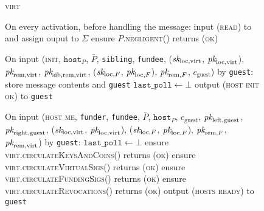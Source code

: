 \begin{figure}[H]
  \begin{processbox}{\textsc{virt}}
    \begin{algorithmic}[1]
      \State On every activation, before handling the message:
      \Indent
         
          \State input (\textsc{read}) to \ledger and assign ouput to $\Sigma$
              \State ensure $P$.\textsc{negligent}() returns (\textsc{ok})
            \EndFor
          \EndIf
        \EndIf
      \EndIndent
      \Statex

      \State {}
      \State On input (\textsc{init}, $\texttt{host}_P$, $\bar{P}$,
      \texttt{sibling}, \texttt{fundee}, ($\textit{sk}_{\mathrm{loc}, \mathrm{virt}}$,
      $\textit{pk}_{\mathrm{loc}, \mathrm{virt}}$), $\textit{pk}_{\mathrm{rem}, \mathrm{virt}}$,
      $\textit{pk}_{\mathrm{sib}, \mathrm{rem}, \mathrm{virt}}$, ($\textit{sk}_{\mathrm{loc}, F}$,
      $\textit{pk}_{\mathrm{loc}, F}$), $\textit{pk}_{\mathrm{rem}, F}$, $c_{\mathrm{guest}}$) by
      \texttt{guest}:
      \Indent
        \State store message contents and \texttt{guest}
        \State $\texttt{last\_poll} \gets \bot$
        \State output (\textsc{host init ok}) to \texttt{guest}
      \EndIndent
      \Statex

      \State On input (\textsc{host me}, \texttt{funder}, \texttt{fundee},
      $\bar{P}$, $\texttt{host}_P$, $c_{\mathrm{guest}}$, $\textit{pk}_{\mathrm{left},
      \mathrm{guest}}$, $\textit{pk}_{\mathrm{right}, \mathrm{guest}}$,
      ($\textit{sk}_{\mathrm{loc}, \mathrm{virt}}$, $\textit{pk}_{\mathrm{loc}, \mathrm{virt}}$),
      ($\textit{sk}_{\mathrm{loc}, F}$, $\textit{pk}_{\mathrm{loc}, F}$), $\textit{pk}_{\mathrm{rem}, F}$,
      $\textit{pk}_{\mathrm{rem}, \mathrm{virt}}$) by \texttt{guest}:
      \Indent
        \State $\texttt{last\_poll} \gets \bot$
        \State ensure \textsc{virt.circulateKeysAndCoins}() returns (\textsc{ok})
        \State ensure \textsc{virt.circulateVirtualSigs}() returns (\textsc{ok})
        \State ensure \textsc{virt.circulateFundingSigs}() returns (\textsc{ok})
        \State ensure \textsc{virt.circulateRevocations}() returns (\textsc{ok})
        \State output (\textsc{hosts ready}) to \texttt{guest}
      \EndIndent
    \end{algorithmic}
  \end{processbox}
  \caption{}
  \label{code:virtual-layer:keys}
\end{figure}


